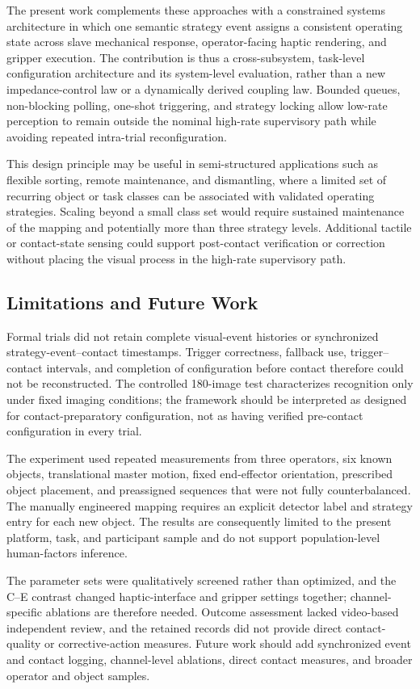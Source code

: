 The present work complements these approaches with a constrained systems architecture in which one semantic strategy event assigns a consistent operating state across slave mechanical response, operator-facing haptic rendering, and gripper execution. The contribution is thus a cross-subsystem, task-level configuration architecture and its system-level evaluation, rather than a new impedance-control law or a dynamically derived coupling law. Bounded queues, non-blocking polling, one-shot triggering, and strategy locking allow low-rate perception to remain outside the nominal high-rate supervisory path while avoiding repeated intra-trial reconfiguration.

This design principle may be useful in semi-structured applications such as flexible sorting, remote maintenance, and dismantling, where a limited set of recurring object or task classes can be associated with validated operating strategies. Scaling beyond a small class set would require sustained maintenance of the mapping and potentially more than three strategy levels. Additional tactile or contact-state sensing could support post-contact verification or correction without placing the visual process in the high-rate supervisory path.

\subsection{Limitations and Future Work}
Formal trials did not retain complete visual-event histories or synchronized strategy-event--contact timestamps. Trigger correctness, fallback use, trigger--contact intervals, and completion of configuration before contact therefore could not be reconstructed. The controlled 180-image test characterizes recognition only under fixed imaging conditions; the framework should be interpreted as designed for contact-preparatory configuration, not as having verified pre-contact configuration in every trial.

The experiment used repeated measurements from three operators, six known objects, translational master motion, fixed end-effector orientation, prescribed object placement, and preassigned sequences that were not fully counterbalanced. The manually engineered mapping requires an explicit detector label and strategy entry for each new object. The results are consequently limited to the present platform, task, and participant sample and do not support population-level human-factors inference.

The parameter sets were qualitatively screened rather than optimized, and the C--E contrast changed haptic-interface and gripper settings together; channel-specific ablations are therefore needed. Outcome assessment lacked video-based independent review, and the retained records did not provide direct contact-quality or corrective-action measures. Future work should add synchronized event and contact logging, channel-level ablations, direct contact measures, and broader operator and object samples.
